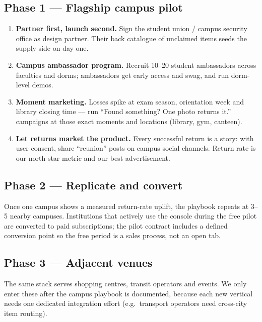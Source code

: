\documentclass[11pt,a4paper]{article}
\begin{document}
\subsection{Phase 1 --- Flagship campus pilot}

\begin{enumerate}
  \item \textbf{Partner first, launch second.} Sign the student union / campus security
        office as design partner. Their back catalogue of unclaimed items seeds the supply
        side on day one.
  \item \textbf{Campus ambassador program.} Recruit 10--20 student ambassadors across
        faculties and dorms; ambassadors get early access and swag, and run dorm-level
        demos.
  \item \textbf{Moment marketing.} Losses spike at exam season, orientation week and
        library closing time --- run ``Found something? One photo returns it.'' campaigns
        at those exact moments and locations (library, gym, canteen).
  \item \textbf{Let returns market the product.} Every successful return is a story: with
        user consent, share ``reunion'' posts on campus social channels. Return rate is our
        north-star metric and our best advertisement.
\end{enumerate}

\subsection{Phase 2 --- Replicate and convert}

Once one campus shows a measured return-rate uplift, the playbook repeats at 3--5 nearby
campuses. Institutions that actively use the console during the free pilot are converted to
paid subscriptions; the pilot contract includes a defined conversion point so the free
period is a sales process, not an open tab.

\subsection{Phase 3 --- Adjacent venues}

The same stack serves shopping centres, transit operators and events. We only enter these
after the campus playbook is documented, because each new vertical needs one dedicated
integration effort (e.g.\ transport operators need cross-city item routing).

\end{document}
